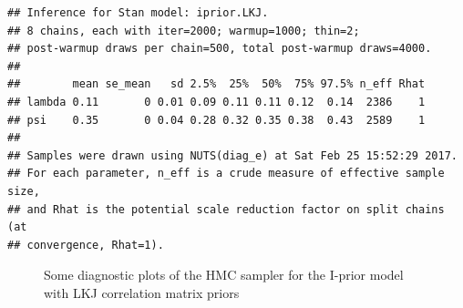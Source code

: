 \documentclass[english, 11pt]{article}
\begin{document}
\begin{knitrout}
\color{fgcolor}\begin{kframe}
\begin{verbatim}
## Inference for Stan model: iprior.LKJ.
## 8 chains, each with iter=2000; warmup=1000; thin=2; 
## post-warmup draws per chain=500, total post-warmup draws=4000.
## 
##        mean se_mean   sd 2.5%  25%  50%  75% 97.5% n_eff Rhat
## lambda 0.11       0 0.01 0.09 0.11 0.11 0.12  0.14  2386    1
## psi    0.35       0 0.04 0.28 0.32 0.35 0.38  0.43  2589    1
## 
## Samples were drawn using NUTS(diag_e) at Sat Feb 25 15:52:29 2017.
## For each parameter, n_eff is a crude measure of effective sample size,
## and Rhat is the potential scale reduction factor on split chains (at 
## convergence, Rhat=1).
\end{verbatim}
\end{kframe}\begin{figure}

{\centering {}

}

\caption[Some diagnostic plots of the HMC sampler for the I-prior model with LKJ correlation matrix priors]{Some diagnostic plots of the HMC sampler for the I-prior model with LKJ correlation matrix priors}\label{fig:iprior.stan7.res}
\end{figure}


\end{knitrout}
\end{document}
